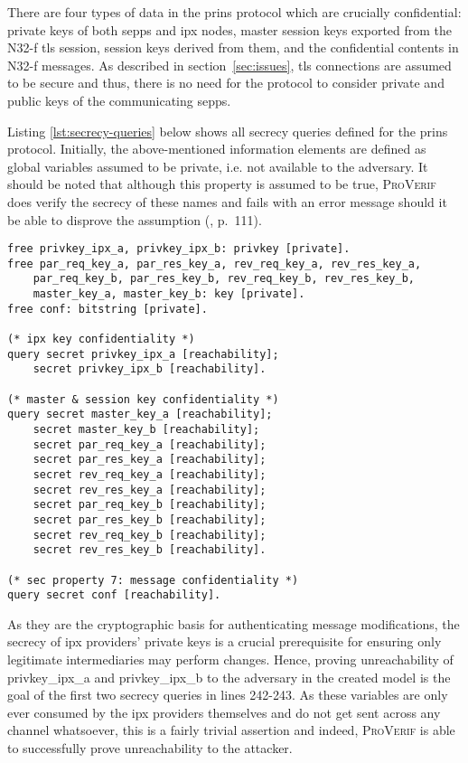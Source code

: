 There are four types of data in the \gls{prins} protocol which are crucially confidential: private keys of both \glspl{sepp} and \gls{ipx} nodes, master session keys exported from the \mbox{N32-f} \gls{tls} session, session keys derived from them, and the confidential contents in N32-f messages.
As described in section~\ref{sec:issues}, \gls{tls} connections are assumed to be secure and thus, there is no need for the protocol to consider private and public keys of the communicating \glspl{sepp}.

Listing \ref{lst:secrecy-queries} below shows all secrecy queries defined for the \gls{prins} protocol.
Initially, the above-mentioned information elements are defined as global variables assumed to be private, i.e. not available to the adversary.
It should be noted that although this property is assumed to be true, \textsc{ProVerif} does verify the secrecy of these names and fails with an error message should it be able to disprove the assumption (\cite{blanchet2020proverif}, p.~111).

\begin{lstlisting}[caption={Secrecy Queries},label={lst:secrecy-queries},firstnumber=235]
free privkey_ipx_a, privkey_ipx_b: privkey [private].
free par_req_key_a, par_res_key_a, rev_req_key_a, rev_res_key_a,
    par_req_key_b, par_res_key_b, rev_req_key_b, rev_res_key_b,
    master_key_a, master_key_b: key [private].
free conf: bitstring [private].

(* ipx key confidentiality *)
query secret privkey_ipx_a [reachability];
    secret privkey_ipx_b [reachability].

(* master & session key confidentiality *)
query secret master_key_a [reachability];
    secret master_key_b [reachability];
    secret par_req_key_a [reachability];
    secret par_res_key_a [reachability];
    secret rev_req_key_a [reachability];
    secret rev_res_key_a [reachability];
    secret par_req_key_b [reachability];
    secret par_res_key_b [reachability];
    secret rev_req_key_b [reachability];
    secret rev_res_key_b [reachability].

(* sec property 7: message confidentiality *)
query secret conf [reachability].
\end{lstlisting}

As they are the cryptographic basis for authenticating message modifications, the secrecy of \gls{ipx} providers' private keys is a crucial prerequisite for ensuring only legitimate intermediaries may perform changes.
Hence, proving unreachability of {\sffamily privkey\_ipx\_a} and {\sffamily privkey\_ipx\_b} to the adversary in the created model is the goal of the first two secrecy queries in lines 242-243.
As these variables are only ever consumed by the \gls{ipx} providers themselves and do not get sent across any channel whatsoever, this is a fairly trivial assertion and indeed, \textsc{ProVerif} is able to successfully prove unreachability to the attacker.

